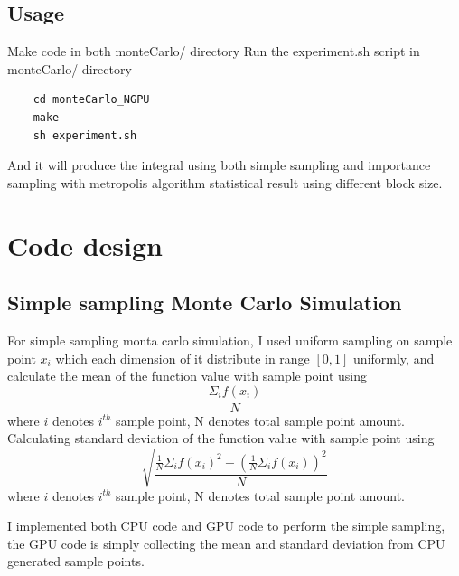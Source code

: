 \documentclass{article}
\begin{document}
	
	\subsection{Usage}
	Make code in both monteCarlo/ directory
	Run the experiment.sh script in monteCarlo/ directory
	
	\begin{verbatim}
	cd monteCarlo_NGPU
	make
	sh experiment.sh
	\end{verbatim}
	
	And it will produce the integral using both simple sampling and importance sampling with metropolis algorithm statistical result using different block size.
	
	\section{Code design}
	\subsection{Simple sampling Monte Carlo Simulation}
	For simple sampling monta carlo simulation, I used uniform sampling on sample point $x_i$ which each dimension of it distribute in range $[0, 1]$ uniformly, and calculate the mean of the function value with sample point using 
	\begin{equation}
		\frac{\Sigma_i{f(x_i)}}{N}
	\end{equation}
	where $i$ denotes $i^{th}$ sample point, N denotes total sample point amount.
	Calculating standard deviation of the function value with sample point using 
	\begin{equation}
		\sqrt{\frac{\frac{1}{N}\Sigma_i{f(x_i)^2}-(\frac{1}{N}\Sigma_i{f(x_i)})^2}{N}}
	\end{equation}
	where $i$ denotes $i^{th}$ sample point, N denotes total sample point amount.
	
	I implemented both CPU code and GPU code to perform the simple sampling, the GPU code is simply collecting the mean and standard deviation from CPU generated sample points.
\end{document}
